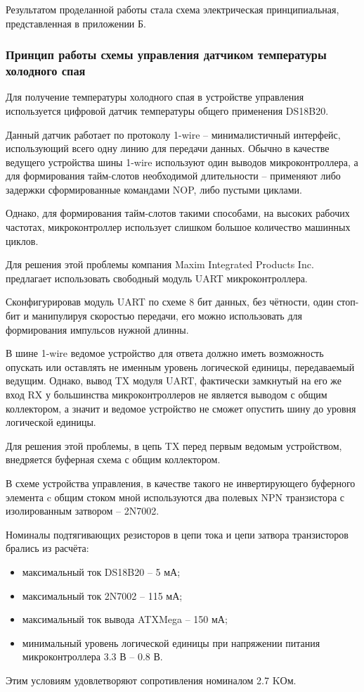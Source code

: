 Результатом проделанной работы стала схема электрическая принципиальная, представленная в приложении Б.


\subsubsection{Принцип работы схемы управления датчиком температуры холодного спая}
Для получение температуры холодного спая в устройстве управления используется цифровой датчик
температуры общего применения DS18B20.

Данный датчик работает по протоколу 1-wire -- минималистичный интерфейс, использующий
всего одну линию для передачи данных. Обычно в качестве ведущего устройства
шины 1-wire используют один выводов микроконтроллера, а для формирования
тайм-слотов необходимой длительности -- применяют либо задержки сформированные
командами NOP, либо пустыми циклами.


Однако, для формирования тайм-слотов такими способами, на высоких рабочих
частотах, микроконтроллер использует слишком большое количество машинных циклов.


Для решения этой проблемы компания Maxim Integrated Products Inc.
предлагает использовать \cite{max2usart} свободный модуль UART микроконтроллера.


Сконфигурировав модуль UART по схеме 8 бит данных, без чётности, один стоп-бит и
манипулируя скоростью передачи, его можно использовать для формирования
импульсов нужной длинны.


В шине 1-wire ведомое устройство для ответа должно иметь возможность
опускать или оставлять не именным уровень логической единицы,
передаваемый ведущим.
Однако, вывод TX модуля UART, фактически замкнутый на его же вход RX у большинства
микроконтроллеров не является выводом с общим коллектором, а значит и ведомое
устройство не сможет опустить шину до уровня логической единицы.

Для решения этой проблемы, в цепь TX перед первым ведомым устройством, внедряется
буферная схема с общим коллектором.

В схеме устройства управления, в качестве такого не инвертирующего буферного
элемента c общим стоком мной используются два полевых NPN транзистора с изолированным
затвором -- 2N7002.

Номиналы подтягивающих резисторов в цепи тока и цепи затвора транзисторов брались из расчёта:
\begin{itemize}
	\item максимальный ток DS18B20 -- 5 мА;
	\item максимальный ток 2N7002 -- 115 мА;
	\item максимальный ток вывода ATXMega -- 150 мА;
	\item минимальный уровень логической единицы при напряжении
		питания микроконтроллера 3.3 В -- 0.8 В.
\end{itemize}
Этим условиям удовлетворяют сопротивления номиналом 2.7 KОм.


